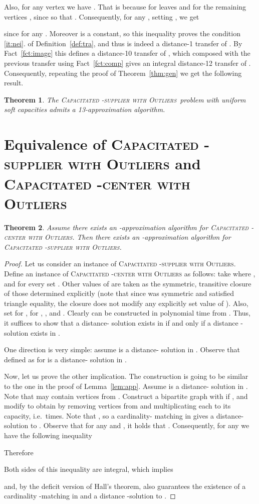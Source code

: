 \documentclass{article}
\newcommand{\fullsup}{\textsc{Capacitated} -\textsc{supplier with Outliers}}
\theoremstyle{plain}
\newtheorem{theorem}{Theorem}
\theoremstyle{definition}
\begin{document}
 Also, for any vertex  we have . That is because for leaves
 and for the remaining vertices , since  so that .
Consequently, for any , setting , we get

since  for any . Moreover  is a constant, so this inequality 
proves the condition \ref{it:nei}. of Definition~\ref{def:tra}, and thus  is indeed a distance-1 transfer of .
By Fact~\ref{fct:image} this defines a distance-10 transfer of ,
which composed with the previous transfer using Fact~\ref{fct:comp} gives an
integral distance-12 transfer of .
Consequently, repeating the proof of Theorem~\ref{thm:gen} we get the
following result.
\begin{theorem}
The \fullsup\  problem with uniform soft capacities admits a 13-approximation
algorithm.
\end{theorem}


\section{Equivalence of \textsc{Capacitated} -\textsc{supplier with Outliers} and \textsc{Capacitated} -\textsc{center with Outliers}}\label{app:equivalence}

\begin{theorem}
Assume there exists an -approximation algorithm for \textsc{Capacitated} -\textsc{center with Outliers}.
Then there exists an -approximation algorithm for \textsc{Capacitated} -\textsc{supplier with Outliers}.
\end{theorem}
\begin{proof}
Let us consider an instance  of \textsc{Capacitated} -\textsc{supplier with Outliers}.
Define an instance  of \textsc{Capacitated} -\textsc{center with Outliers} as
follows: take  where , and
for every  set . Other values of  
are taken as the symmetric, transitive closure of those determined explicitly (note that since  was symmetric and satisfied triangle equality,
the closure does not modify any explicitly set value of ).
Also, set  for ,  for , , and .
Clearly  can be constructed in polynomial time from .
Thus, it suffices to show that a distance- solution exists in  if
and only if a distance -solution exists in .

One direction is very simple: assume  is a distance- solution in .
Observe that  defined as 
for  is a distance- solution in .

Now, let us prove the other implication. The construction is going
to be similar to the one in the proof of Lemma~\ref{lem:app}.
Assume  is a distance-
solution in . Note that  may contain vertices from .
Construct a bipartite graph  with  if ,
and modify  to obtain  by removing vertices from  and multiplicating each 
to its capacity, i.e.\  times.
Note that , so  a cardinality- matching in  gives a distance- solution to .
Observe that for any  and , it holds that .
Consequently, for any 
 we have the following inequality

Therefore

Both sides of this inequality are integral, which implies 

and, by the deficit version of Hall's theorem, also guarantees the existence of a cardinality -matching in  and a distance -solution to .
\end{proof}
\end{document}
